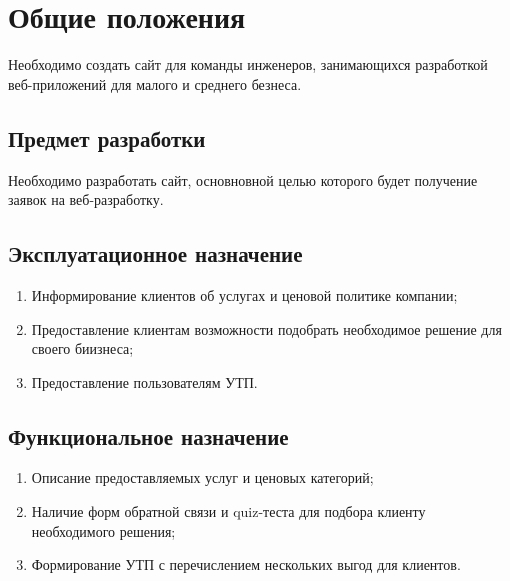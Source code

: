 \section{Общие положения}
Необходимо создать сайт для команды инженеров, занимающихся разработкой веб-приложений для малого и среднего безнеса.
\subsection{Предмет разработки}
Необходимо разработать сайт, основновной целью которого будет получение заявок на веб-разработку.
\subsection{Эксплуатационное назначение}
\begin{enumerate}
  \item Информирование клиентов об услугах и ценовой политике компании;
  \item Предоставление клиентам возможности подобрать необходимое решение для своего биизнеса;
  \item Предоставление пользователям УТП.
\end{enumerate}

\subsection{Функциональное назначение}
\begin{enumerate}
  \item Описание предоставляемых услуг и ценовых категорий;
  \item Наличие форм обратной связи и quiz-теста для подбора клиенту необходимого решения;
  \item Формирование УТП с перечислением нескольких выгод для клиентов.
\end{enumerate}

